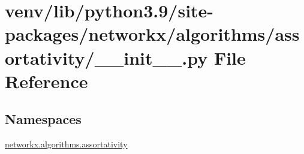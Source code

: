 \hypertarget{venv_2lib_2python3_89_2site-packages_2networkx_2algorithms_2assortativity_2____init_____8py}{}\section{venv/lib/python3.9/site-\/packages/networkx/algorithms/assortativity/\+\_\+\+\_\+init\+\_\+\+\_\+.py File Reference}
\label{venv_2lib_2python3_89_2site-packages_2networkx_2algorithms_2assortativity_2____init_____8py}
\subsection*{Namespaces}
\begin{DoxyCompactItemize}
\item 
 \hyperlink{namespacenetworkx_1_1algorithms_1_1assortativity}{networkx.\+algorithms.\+assortativity}
\end{DoxyCompactItemize}
